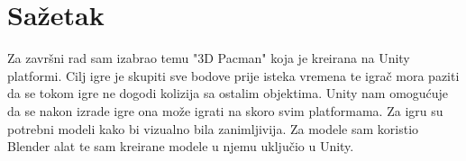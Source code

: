 \section*{Sažetak}
\label{sec:summary}
Za završni rad sam izabrao temu "3D Pacman" koja je kreirana na Unity platformi. Cilj igre je skupiti sve bodove prije isteka vremena te igrač mora paziti da se tokom igre ne dogodi kolizija sa ostalim objektima. Unity nam omogućuje da se nakon izrade igre ona može igrati na skoro svim platformama.
Za igru su potrebni modeli kako bi vizualno bila zanimljivija. Za modele sam koristio Blender alat te sam kreirane modele u njemu uključio u Unity.